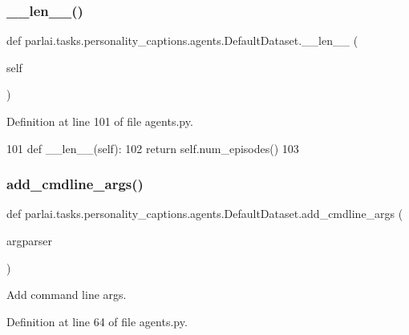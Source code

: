 \subsubsection{\texorpdfstring{\+\_\+\+\_\+len\+\_\+\+\_\+()}{\_\_len\_\_()}}
{\footnotesize\ttfamily def parlai.\+tasks.\+personality\+\_\+captions.\+agents.\+Default\+Dataset.\+\_\+\+\_\+len\+\_\+\+\_\+ (\begin{DoxyParamCaption}\item[{}]{self }\end{DoxyParamCaption})}



Definition at line 101 of file agents.\+py.


\begin{DoxyCode}
101     \textcolor{keyword}{def }\_\_len\_\_(self):
102         \textcolor{keywordflow}{return} self.num\_episodes()
103 
\end{DoxyCode}
\mbox{\label{classparlai_1_1tasks_1_1personality__captions_1_1agents_1_1DefaultDataset_ae81ce7e05c42b214d42a5a4a5c471c8e}} 
\subsubsection{\texorpdfstring{add\+\_\+cmdline\+\_\+args()}{add\_cmdline\_args()}}
{\footnotesize\ttfamily def parlai.\+tasks.\+personality\+\_\+captions.\+agents.\+Default\+Dataset.\+add\+\_\+cmdline\+\_\+args (\begin{DoxyParamCaption}\item[{}]{argparser }\end{DoxyParamCaption})\hspace{0.3cm}{\ttfamily [static]}}

\begin{DoxyVerb}Add command line args.
\end{DoxyVerb}
 

Definition at line 64 of file agents.\+py.


